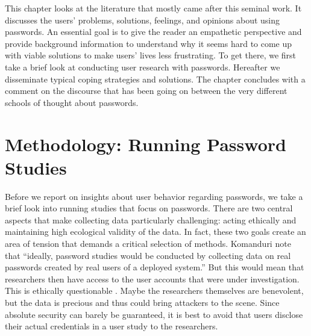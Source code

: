 This chapter looks at the literature that mostly came after this seminal work. It discusses the users' problems, solutions, feelings, and opinions about using passwords. An essential goal is to give the reader an empathetic perspective and provide background information to understand why it seems hard to come up with viable solutions to make users' lives less frustrating. To get there, we first take a brief look at conducting user research with passwords. Hereafter we disseminate typical coping strategies and solutions. The chapter concludes with a comment on the discourse that has been going on between the very different schools of thought about passwords. 








\section{Methodology: Running Password Studies}\label{sec:rw:methodology}
Before we report on insights about user behavior regarding passwords, we take a brief look into running studies that focus on passwords. There are two central aspects that make collecting data particularly challenging: acting ethically and maintaining high ecological validity of the data. In fact, these two goals create an area of tension that demands a critical selection of methods. Komanduri \etal note that ``ideally, password studies would be conducted by collecting data on real passwords created by real users of a deployed system.'' \cite{Komanduri2011OfPasswordsAndPeople} But this would mean that researchers then have access to the user accounts that were under investigation. This is ethically questionable \cite{Egelman2012ItsNotStealing}. Maybe the researchers themselves are benevolent, but the data is precious and thus could bring attackers to the scene. Since absolute security can barely be guaranteed, it is best to avoid that users disclose their actual credentials in a user study to the researchers. 

